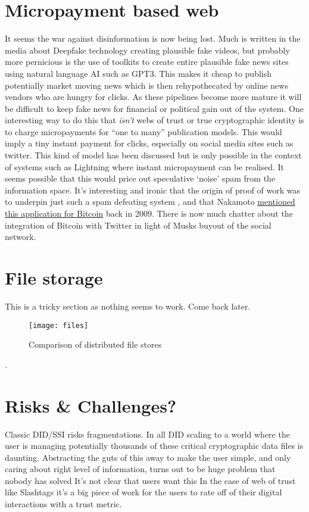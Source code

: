 \section{Micropayment based web}
It seems the war against disinformation is now being lost. Much is written in the media about Deepfake technology creating plausible fake videos, but probably more pernicious is the use of toolkits to create entire plausible fake news sites using natural language AI such as GPT3. This makes it cheap to publish potentially market moving news which is then rehypothecated by online news vendors who are hungry for clicks. As these pipelines become more mature it will be difficult to keep fake news for financial or political gain out of the system. One interesting way to do this that \textit{isn't} webs of trust or true cryptographic identity is to charge micropayments for ``one to many'' publication models. This would imply a tiny instant payment for clicks, especially on social media sites such as twitter. This kind of model has been discussed but is only possible in the context of systems such as Lightning where instant micropayment can be realised. It seems possible that this would price out speculative `noise' spam from the information space. It's interesting and ironic that the origin of proof of work was to underpin just such a spam defeating system  \cite{dwork1992pricing}, and that Nakamoto \href{https://www.metzdowd.com/pipermail/cryptography/2009-January/015014.html}{mentioned this application for Bitcoin} back in 2009. There is now much chatter about the integration of Bitcoin with Twitter in light of Musks buyout of the social network.
\section{File storage}
This is a tricky section as nothing seems to work. Come back later.
\begin{figure}
\texttt{[image: files]}
  \caption{Comparison of distributed file stores}
  \label{fig:Files}
\end{figure}. 
\section{Risks \& Challenges?}
Classic DID/SSI risks fragmentations. 
In all DID scaling to a world where the user is managing potentially thousands of these critical cryptographic data files is daunting.
Abstracting the guts of this away to make the user simple, and only caring about right level of information, turns out to be huge problem that nobody has solved
It's not clear that users want this
In the case of web of trust like Slashtags it's a big piece of work for the users to rate off of their digital interactions with a trust metric.


